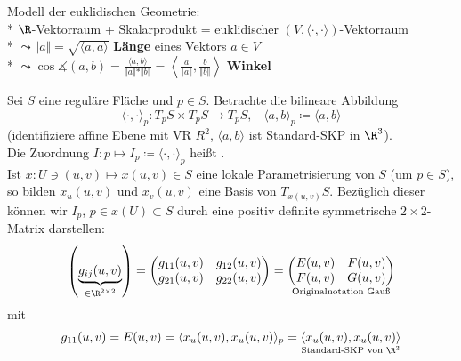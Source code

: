 \begin{remark}[Erinnerung an LA]
  Modell der euklidischen Geometrie: \\*
  $ \R $-Vektorraum + Skalarprodukt = euklidischer $ (V, \langle \cdot, \cdot \rangle) $-Vektorraum \\*
  $ \leadsto \Vert a \Vert = \sqrt{\langle a, a \rangle} $ \textbf{Länge} eines Vektors $ a \in V $ \\*
  $ \leadsto \cos \measuredangle(a,b) = \frac{\langle a, b \rangle}{\Vert a \Vert*\Vert b \Vert} = \left\langle \frac{a}{\Vert a \Vert}, \frac{b}{\Vert b \Vert} \right\rangle $ \textbf{Winkel} \\
\end{remark}

\begin{remark}
  Sei $ S $ eine reguläre Fläche und $ p \in S $. Betrachte die bilineare Abbildung
  \begin{equation*}
    \langle \cdot, \cdot \rangle_p : T_pS \times T_pS \to T_pS\text{,} \quad \langle a, b \rangle_p \coloneqq \langle a, b \rangle
  \end{equation*}
  (identifiziere affine Ebene mit VR $ R^2 $, $ \langle a, b \rangle $ ist Standard-SKP in $ \R^3 $). \\
  Die Zuordnung $ I: p \mapsto I_p \coloneqq \langle \cdot, \cdot \rangle_p $ heißt \label{def:ersteFundamentalform}. \\
  Ist $ x: U \ni (u,v) \mapsto x(u,v) \in S $ eine lokale Parametrisierung von $ S $ (um $ p \in S $), so bilden $ x_u(u,v) $ und $ x_v(u,v) $ eine Basis von $ T_{x(u,v)}S $. Bezüglich dieser können wir $ I_p $, $ p \in x(U) \subset S $ durch eine positiv definite symmetrische $ 2 \times 2 $-Matrix darstellen:
  \begin{equation*}
      \left( \underbrace{g_{ij}(u,v)}_{\in \R^{2 \times 2}} \right) = \begin{pmatrix}
        g_{11}(u,v) & g_{12}(u,v) \\
        g_{21}(u,v) & g_{22}(u,v)
      \end{pmatrix} = \underset{\text{Originalnotation Gauß}}{\begin{pmatrix}
        E(u,v) & F(u,v) \\
        F(u,v) & G(u,v)
      \end{pmatrix}}
  \end{equation*}
  mit
  \begin{align*}
    g_{11}(u,v) = E(u,v) &= \langle x_u(u,v),x_u(u,v) \rangle_p = \underset{\text{Standard-SKP von }\R^3}{\langle x_u(u,v),x_u(u,v) \rangle} \\

\end{align*}
\end{remark}

